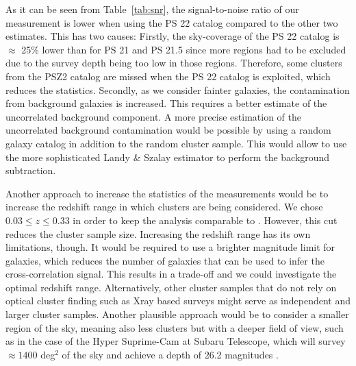 \documentclass[iop, apjl, twocolappendix, numberedappendix]{emulateapj}
\begin{document}

As it can be seen from Table~\ref{tab:snr}, the signal-to-noise
ratio of our measurement is lower when using the PS 22 catalog
compared to the other two estimates. This has two causes: Firstly,
the sky-coverage of the PS 22 catalog is $\approx$ 25\% lower than
for PS 21 and PS 21.5 since more regions had to be excluded due to
the survey depth being too low in those regions. Therefore, some
clusters from the PSZ2 catalog are missed when the PS 22 catalog is
exploited, which reduces the statistics. Secondly, as we consider
fainter galaxies, the contamination from background galaxies is
increased. This requires a better estimate of the uncorrelated
background component. A more precise estimation of the uncorrelated
background contamination would be possible by using a random galaxy
catalog in addition to the random cluster sample. This would allow
to use the more sophisticated Landy \& Szalay estimator
\citep{landy1993bias} to perform the background subtraction.

Another approach to increase the statistics of the measurements would be to increase the redshift range in which clusters are being considered. We chose $0.03 \leq z \leq 0.33$ in order to keep the analysis comparable to \citet{more2016detection}. However, this cut reduces the cluster sample size. Increasing the redshift range has its own limitations, though. It would be required to use a brighter magnitude limit for galaxies, which reduces the number of galaxies that can be used to infer the cross-correlation signal. This results in a trade-off and we could investigate the optimal redshift range. Alternatively, other cluster samples that do not rely on optical cluster finding such as Xray based surveys might serve as independent and larger cluster samples. 
Another plausible approach would be to consider a smaller region of
the sky, meaning also less clusters but with a deeper field of view,
such as in the case of the Hyper Suprime-Cam at Subaru Telescope,
which will survey $\approx 1400$ deg$^2$ of the sky and achieve a
depth of 26.2 magnitudes \citep{takada2010subaru}.
\end{document}
